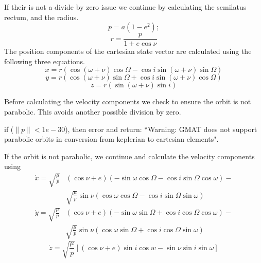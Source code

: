 \noindent If their is not a divide by zero issue we continue  by
calculating the semilatus rectum, and the radius.
%
\begin{equation}
    p = a(1-e^2);
\end{equation}
%
\begin{equation}
     r = \frac{p}{1+e\cos{\nu}}
\end{equation}
%
The position components of the cartesian state vector are
calculated using the following three equations.
%
\begin{equation}
     x = r\left(\cos{(\omega + \nu)}\cos{\Omega} - \cos{i}\sin{(\omega + \nu)}\sin{\Omega}\right)
\end{equation}
\begin{equation}
     y = r\left(\cos{(\omega + \nu)}\sin{\Omega} + \cos{i}\sin{(\omega + \nu)}\cos{\Omega}\right)
\end{equation}
\begin{equation}
     z = r\left(\sin{(\omega + \nu)}\sin{i}\right)
\end{equation}
%

Before calculating the velocity components we check to ensure the
orbit is not parabolic.  This avoids another possible division by
zero.

\noindent if ($\| p\| < 1e-30$), then error and return: ``Warning:
GMAT does not support parabolic orbits in conversion from
keplerian to cartesian elements".

\noindent If the orbit is not parabolic, we continue and calculate
the velocity components using
%
\begin{equation}\begin{split}
     \dot{x} = \sqrt{\frac{\mu}{p}} &  \left( \cos{\nu} + e \right)
     \left( -\sin{\omega}\cos{\Omega} - \cos{i}\sin{\Omega}\cos{\omega}
     \right)- \\ &\sqrt{\frac{\mu}{p}}  \sin{\nu}\left(\cos{\omega}\cos{\Omega} - \cos{i}\sin{\Omega}\sin{\omega} \right)
      \end{split}
\end{equation}
%
\begin{equation}\begin{split}
     \dot{y} =    \sqrt{\frac{\mu}{p}}&  \left( \cos{\nu} + e \right)
     \left( -\sin{\omega}\sin{\Omega} + \cos{i}\cos{\Omega}\cos{\omega}
     \right)- \\\ & \sqrt{\frac{\mu}{p}}\sin{\nu}\left(\cos{\omega}\sin{\Omega} + \cos{i}\cos{\Omega}\sin{\omega} \right)
     \end{split}
\end{equation}
%
\begin{equation}
     \dot{z} = \sqrt{\frac{\mu}{p}} \left[ \left( \cos{\nu} + e \right)\sin{i}\cos{w} - \sin{\nu}\sin{i}\sin{\omega}      \right]
\end{equation}

